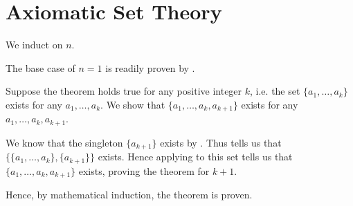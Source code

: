 \section{Axiomatic Set Theory}
\begin{questions}
    \item We induct on $n$.

    The base case of $n = 1$ is readily proven by .

    Suppose the theorem holds true for any positive integer $k$, i.e. the set $\{a_1, \dots, a_k\}$ exists for any $a_1, \dots, a_k$. We show that $\{a_1, \dots, a_k, a_{k+1}\}$ exists for any $a_1, \dots, a_k, a_{k+1}$.

    We know that the singleton $\{a_{k+1}\}$ exists by . Thus  tells us that $\{\{a_1, \dots, a_k\}, \{a_{k+1}\}\}$ exists. Hence applying  to this set tells us that $\{a_1, \dots, a_k, a_{k+1}\}$ exists, proving the theorem for $k + 1$.

    Hence, by mathematical induction, the theorem is proven.
\end{questions}

